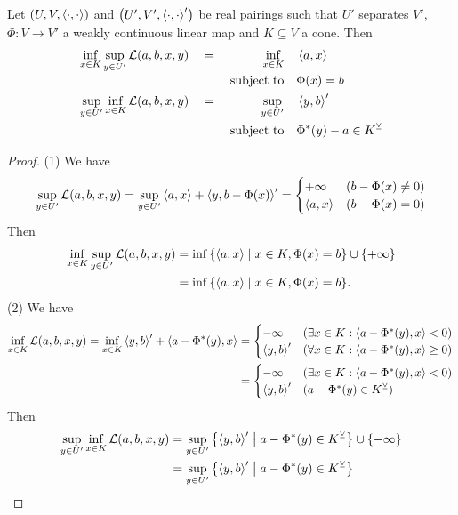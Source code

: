 \begin{lemma} \label{weakDualityLemma}
Let $\sSet{U,V,\pair{\cdot,\cdot}}$ and $\sSet{U',V',\pair{\cdot,\cdot}'}$ be real pairings such that $U'$ separates $V'$, $\Phi: V\to V'$ a weakly continuous linear map and $K\subseteq V$ a cone. Then
\begin{align*}
\inf_{x\in K}\sup_{y\in U'} \mathcal{L}(a,b,x,y) \quad&=\quad \begin{aligned}[t]
\inf_{x\in K} \quad & \left\langle a,x \right\rangle \\
\text{subject to} \quad & \Phi(x) = b
\end{aligned} \\
\sup_{y\in U'}\inf_{x\in K} \mathcal{L}(a,b,x,y) \quad&=\quad \begin{aligned}[t]
\sup_{y\in U'} \quad & \left\langle y,b \right\rangle' \\
\text{subject to} \quad & \Phi^*(y) - a \in K^\veebar
\end{aligned}
\end{align*}
\end{lemma}
\begin{proof}
(1) We have
\[ \sup_{y\in U'} \mathcal{L}(a,b,x,y) = \sup_{y\in U'} \left\langle a,x \right\rangle + \left\langle y,b - \Phi(x) \right\rangle' = \begin{cases}
+\infty & (b - \Phi(x) \neq 0) \\
\left\langle a,x \right\rangle & (b - \Phi(x) = 0)
\end{cases} \]
Then
\begin{align*}
\inf_{x\in K}\sup_{y\in U'} \mathcal{L}(a,b,x,y) &= \inf\setbuilder{\pair{a,x}}{x\in K, \Phi(x) = b} \cup\{+\infty\} \\
&= \inf\setbuilder{\pair{a,x}}{x\in K, \Phi(x) = b}.
\end{align*}
(2) We have
\begin{align*}
\inf_{x\in K} \mathcal{L}(a,b,x,y) = \inf_{x\in K} \left\langle y,b \right\rangle' + \left\langle a-\Phi^*(y), x \right\rangle &= \begin{cases}
- \infty & (\exists x\in K: \left\langle a-\Phi^*(y), x \right\rangle < 0) \\
\left\langle y,b \right\rangle' & (\forall x\in K: \left\langle a-\Phi^*(y), x \right\rangle \geq 0) \\
\end{cases} \\
&= \begin{cases}
- \infty & (\exists x\in K: \left\langle a-\Phi^*(y), x \right\rangle < 0) \\
\left\langle y,b \right\rangle' & (a-\Phi^*(y)\in K^\veebar) \\
\end{cases}
\end{align*}
Then
\begin{align*}
\sup_{y\in U'}\inf_{x\in K} \mathcal{L}(a,b,x,y) &= \sup_{y\in U'} \setbuilder{\pair{y,b}'}{a-\Phi^*(y) \in K^\pairingAligned} \cup \{-\infty\} \\
&= \sup_{y\in U'} \setbuilder{\pair{y,b}'}{a-\Phi^*(y) \in K^\pairingAligned}
\end{align*}
\end{proof}

